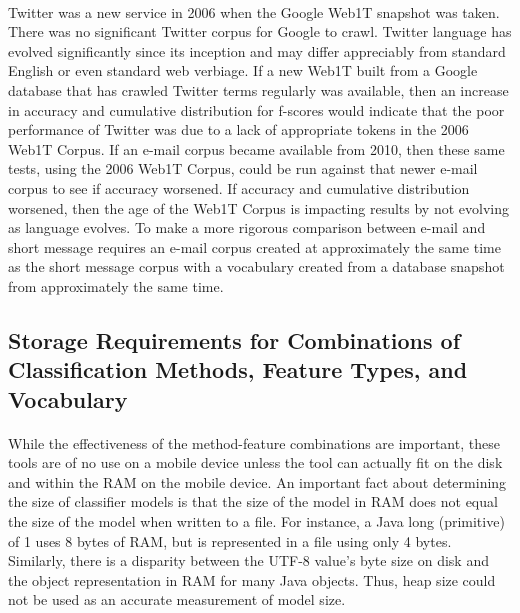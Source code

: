 		\paragraph*{} Twitter was a new service in 2006 when the Google Web1T snapshot was taken.  There was no significant Twitter corpus for Google to crawl.  Twitter language has evolved significantly since its inception and may differ appreciably from standard English or even standard web verbiage.  If a new Web1T built from a Google database that has crawled Twitter terms regularly was available, then an increase in accuracy and cumulative distribution for f-scores would indicate that the poor performance of Twitter was due to a lack of appropriate tokens in the 2006 Web1T Corpus.  If an e-mail corpus became available from 2010, then these same tests, using the 2006 Web1T Corpus, could be run against that newer e-mail corpus to see if accuracy worsened.  If accuracy and cumulative distribution worsened, then the age of the Web1T Corpus is impacting results by not evolving as language evolves.  To make a more rigorous comparison between e-mail and short message requires an e-mail corpus created at approximately the same time as the short message corpus with a vocabulary created from a database snapshot from approximately the same time.

\begin{singlespace}
\section{Storage Requirements for Combinations of Classification Methods, Feature Types, and Vocabulary}
\end{singlespace}
	\paragraph*{} While the effectiveness of the method-feature combinations are important, these tools are of no use on a mobile device unless the tool can actually fit on the disk and within the RAM on the mobile device.  An important fact about determining the size of classifier models is that the size of the model in RAM does not equal the size of the model when written to a file.  For instance, a Java long (primitive) of 1 uses 8 bytes of RAM, but is represented in a file using only 4 bytes.  Similarly, there is a disparity between the UTF-8 value's byte size on disk and the object representation in RAM for many Java objects.  Thus, heap size could not be used as an accurate measurement of model size.
